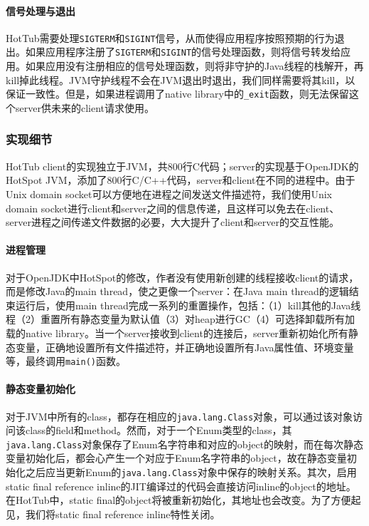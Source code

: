 \documentclass[lang=cn,12pt,a4paper,cite=authoryear]{elegantpaper}
\begin{document}
\paragraph{信号处理与退出}
HotTub需要处理\texttt{SIGTERM}和\texttt{SIGINT}信号，从而使得应用程序按照预期的行为退出。如果应用程序注册了\texttt{SIGTERM}和\texttt{SIGINT}的信号处理函数，则将信号转发给应用。如果应用没有注册相应的信号处理函数，则将非守护的Java线程的栈解开，再kill掉此线程。JVM守护线程不会在JVM退出时退出，我们同样需要将其kill，以保证一致性。但是，如果进程调用了native library中的\texttt{\_exit}函数，则无法保留这个server供未来的client请求使用。

\subsubsection{实现细节}
HotTub client的实现独立于JVM，共800行C代码；server的实现基于OpenJDK的HotSpot JVM，添加了800行C/C++代码，server和client在不同的进程中。由于Unix domain socket可以方便地在进程之间发送文件描述符，我们使用Unix domain socket进行client和server之间的信息传递，且这样可以免去在client、server进程之间传递文件数据的必要，大大提升了client和server的交互性能。

\paragraph{进程管理} 对于OpenJDK中HotSpot的修改，作者没有使用新创建的线程接收client的请求，而是修改Java的main thread，使之更像一个server：在Java main thread的逻辑结束运行后，使用main thread完成一系列的重置操作，包括：（1）kill其他的Java线程（2）重置所有静态变量为默认值（3）对heap进行GC（4）可选择卸载所有加载的native library。当一个server接收到client的连接后，server重新初始化所有静态变量，正确地设置所有文件描述符，并正确地设置所有Java属性值、环境变量等，最终调用\texttt{main()}函数。

\paragraph{静态变量初始化} 对于JVM中所有的class，都存在相应的\texttt{java.lang.Class}对象，可以通过该对象访问该class的field和method。然而，对于一个Enum类型的class，其\texttt{java.lang.Class}对象保存了Enum名字符串和对应的object的映射，而在每次静态变量初始化后，都会心产生一个对应于Enum名字符串的object，故在静态变量初始化之后应当更新Enum的\texttt{java.lang.Class}对象中保存的映射关系。其次，启用static final reference inline的JIT编译过的代码会直接访问inline的object的地址。在HotTub中，static final的object将被重新初始化，其地址也会改变。为了方便起见，我们将static final reference inline特性关闭。
\end{document}
